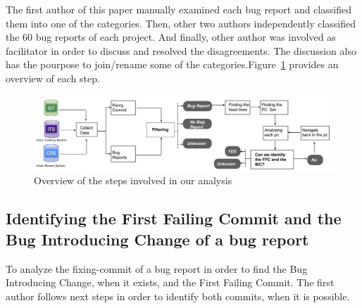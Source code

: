 \documentclass[a4paper, 12pt]{book}
\begin{document}
The first author of this paper manually examined each bug report and classified them into one of the categories. Then, other two authors independently classified the 60 bug reports of each project. And finally, other author was involved as facilitator in order to discuss and resolved the disagreements. The discussion also has the pourpose to join/rename some of the categories.Figure~\ref{fig:diagram} provides an overview of each step.

 \begin{figure}[ht]
 \centering
 \includegraphics[width=\columnwidth]{img/diagram.png}
 \caption{Overview of the steps involved in our analysis }
 \label{fig:diagram}       %
 \end{figure}

\subsection{Identifying the First Failing Commit and the Bug Introducing Change of a bug report}
To analyze the fixing-commit of a bug report in order to find the Bug Introducing Change, when it exists, and the First Failing Commit. The first author follows next steps in order to identify both commits, when it is possible.
\end{document}
